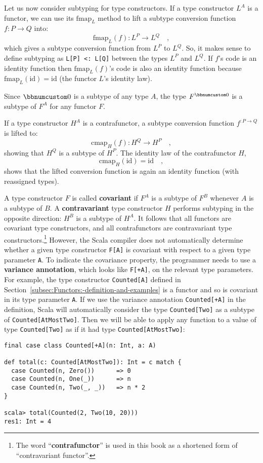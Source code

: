 Let us now consider subtyping for type constructors. If a type constructor
$L^{A}$ is a functor, we can use its $\text{fmap}_{L}$ method to
lift a subtype conversion function $f:P\rightarrow Q$ into:
\[
\text{fmap}_{L}(f):L^{P}\rightarrow L^{Q}\quad,
\]
which gives a subtype conversion function from $L^{P}$ to $L^{Q}$.
So, it makes sense to define subtyping as \lstinline!L[P] <: L[Q]!
between the types $L^{P}$ and $L^{Q}$. If $f$\textsf{'}s code is an identity
 function then $\text{fmap}_{L}(f)$\textsf{'}s code is also an identity function
because $\text{fmap}_{L}(\text{id})=\text{id}$ (the functor $L$\textsf{'}s
identity law).

Since $\bbnum 0$ is a subtype of any type $A$, the type $F^{\bbnum 0}$
is a subtype of $F^{A}$ for any functor $F$.

If a type constructor $H^{A}$ is a contrafunctor, a subtype conversion
function $f^{:P\rightarrow Q}$ is lifted to:
\[
\text{cmap}_{H}(f):H^{Q}\rightarrow H^{P}\quad,
\]
showing that $H^{Q}$ is a subtype of $H^{P}$. The identity law of
the contrafunctor $H$,
\[
\text{cmap}_{H}(\text{id})=\text{id}\quad,
\]
shows that the lifted conversion function is again an identity function
(with reassigned types).

A type constructor $F$ is called \textbf{covariant}
if $F^{A}$ is a subtype of $F^{B}$ whenever $A$ is a subtype of
$B$. A \textbf{contravariant}
type constructor $H$ performs subtyping in the opposite direction:
$H^{B}$ is a subtype of $H^{A}$. It follows that all functors are
covariant type constructors, and all contrafunctors are contravariant
type constructors.\footnote{The word \textsf{``}\textbf{contrafunctor}\textsf{''} is used
in this book as a shortened form of \textsf{``}contravariant
functor\textsf{''}.} However, the Scala compiler does not automatically determine whether
a given type constructor \lstinline!F[A]! is covariant with respect
to a given type parameter \lstinline!A!. To indicate the covariance
property, the programmer needs to use a \textbf{variance
annotation}, which looks like \lstinline!F[+A]!, on the relevant
type parameters. For example, the type constructor \lstinline!Counted[A]!
defined in Section~\ref{subsec:Functors:-definition-and-examples}
is a functor and so is covariant in its type parameter \lstinline!A!.
If we use the variance annotation \lstinline!Counted[+A]! in the
definition, Scala will automatically consider the type \lstinline!Counted[Two]!
as a subtype of \lstinline!Counted[AtMostTwo]!. Then we will be able
to apply any function to a value of type \lstinline!Counted[Two]!
as if it had type \lstinline!Counted[AtMostTwo]!:
\begin{lstlisting}
final case class Counted[+A](n: Int, a: A)

def total(c: Counted[AtMostTwo]): Int = c match {
  case Counted(n, Zero())      => 0
  case Counted(n, One(_))      => n
  case Counted(n, Two(_, _))   => n * 2
}

scala> total(Counted(2, Two(10, 20)))
res1: Int = 4
\end{lstlisting}

